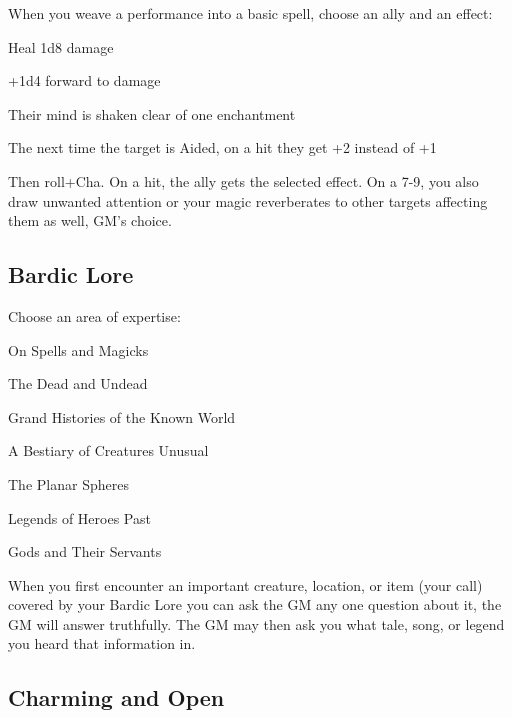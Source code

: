 When you weave a performance into a basic spell, choose an ally and an effect:

 
\startitemize[1,packed]

\item Heal 1d8 damage

 
\item +1d4 forward to damage

 
\item Their mind is shaken clear of one enchantment

 
\item The next time the target is Aided, on a hit they get +2 instead of +1


\stopitemize
 

Then roll+Cha. On a hit, the ally gets the selected effect. On a 7-9, you also draw unwanted attention or your magic reverberates to other targets affecting them as well, GM's choice.

 
\subsection{Bardic Lore}    
 

Choose an area of expertise:

 
\startitemize[1,packed]

\item On Spells and Magicks

 
\item The Dead and Undead

 
\item Grand Histories of the Known World

 
\item A Bestiary of Creatures Unusual

 
\item The Planar Spheres

 
\item Legends of Heroes Past

 
\item Gods and Their Servants


\stopitemize
 

When you first encounter an important creature, location, or item (your call) covered by your Bardic Lore you can ask the GM any one question about it, the GM will answer truthfully. The GM may then ask you what tale, song, or legend you heard that information in.

 
\subsection{Charming and Open}   
 


